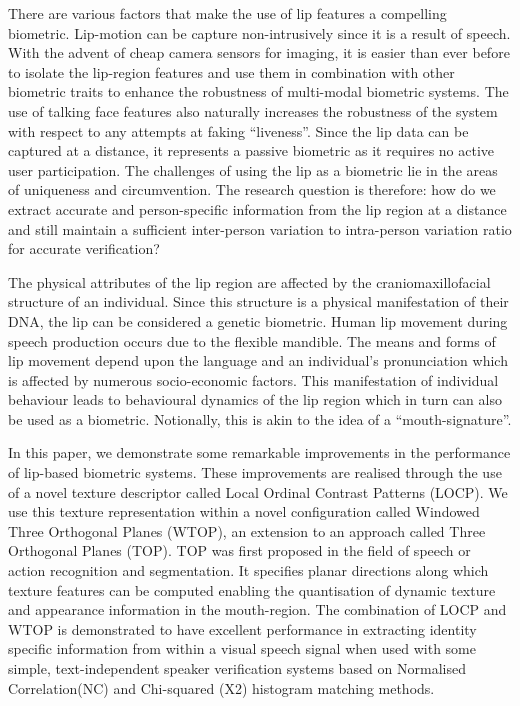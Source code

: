 \documentclass[a4paper, 10pt, conference]{ieeeconf}      %
\begin{document}
There are various factors that make the use of lip features a compelling biometric. 
Lip-motion can be capture non-intrusively since it is a result of speech.
With the advent of cheap camera sensors for imaging, it is easier than ever before to isolate the lip-region features and use them in combination with other biometric traits to enhance the robustness of multi-modal biometric systems. 
The use of talking face features also naturally increases the robustness of the system with respect to any attempts at faking ``liveness''. 
Since the lip data can be captured at a distance, it represents a passive biometric as it requires no active user participation. 
The challenges of using the lip as a biometric lie in the areas of uniqueness and circumvention. 
The research question is therefore: how do we extract accurate and person-specific information from the lip region at a distance and still maintain a sufficient inter-person variation to intra-person variation ratio for accurate verification? 

The physical attributes of the lip region are affected by the craniomaxillofacial structure of an individual.
Since this structure is a physical manifestation of their DNA, the lip can be considered a genetic biometric.
Human lip movement during speech production occurs due to the flexible mandible. 
The means and forms of lip movement depend upon the language and an individual's pronunciation which is affected by numerous socio-economic factors. 
This manifestation of individual behaviour leads to behavioural dynamics of the lip region which in turn can also be used as a biometric.
Notionally, this is akin to the idea of a ``mouth-signature''. 

In this paper, we demonstrate some remarkable improvements in the performance of lip-based biometric systems. 
These improvements are realised through the use of a novel texture descriptor called Local Ordinal Contrast Patterns (LOCP). 
We use this texture representation within a novel configuration called Windowed Three Orthogonal Planes (WTOP), an extension to an approach called Three Orthogonal Planes (TOP). 
TOP was first proposed in the field of speech or action recognition and segmentation. 
It specifies planar directions along which texture features can be computed enabling the quantisation of dynamic texture and appearance information in the mouth-region. 
The combination of LOCP and WTOP is demonstrated to have excellent performance in extracting identity specific information from within a visual speech signal when used with some simple, text-independent speaker verification systems based on Normalised Correlation(NC) and Chi-squared (X2) histogram matching methods.
\end{document}
